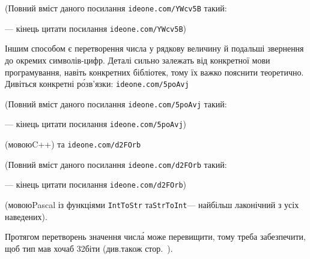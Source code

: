 \documentclass[14pt,a4paper]{extarticle}
\renewcommand{\baselinestretch}{1.3125}
\begin{document}
{\color{green}\begin{small}

\renewcommand{\baselinestretch}{0.875}

(Повний вміст даного посилання \verb"ideone.com/YWcv5B" такий:

--- кінець цитати посилання \verb"ideone.com/YWcv5B")

\end{small}}




Іншим способом є перетворення числа у рядкову величину й подальші звернення до окремих символів-цифр. Деталі сильно залежать від конкретної мови програмування, навіть конкретних бібліотек, тому їх важко пояснити теоретично. Дивіться конкретні р\'{о}зв'язки: 
\verb"ideone.com/5poAvj"


{\color{green}\begin{small}

\renewcommand{\baselinestretch}{0.875}

(Повний вміст даного посилання \verb"ideone.com/5poAvj" такий:

--- кінець цитати посилання \verb"ideone.com/5poAvj")

\end{small}}


 (мовою\nolinebreak[2] C++) та 
\verb"ideone.com/d2FOrb"


{\color{green}\begin{small}

\renewcommand{\baselinestretch}{0.875}

(Повний вміст даного посилання \verb"ideone.com/d2FOrb" такий:

--- кінець цитати посилання \verb"ideone.com/d2FOrb")

\end{small}}


 (мовою\nolinebreak[1] Pascal із функціями \texttt{IntToStr} та\nolinebreak[2] \texttt{StrToInt}\nolinebreak[3] --- найбільш лаконічний з усіх наведених).

Протягом перетворень значення числ\'{а} може перевищити, тому треба забезпечити, щоб тип мав хоча\nolinebreak[3] б 32\nolinebreak[3] біти (див.\nolinebreak[2] також стор.~\pageref{text:overflow-example}).
\end{document}
